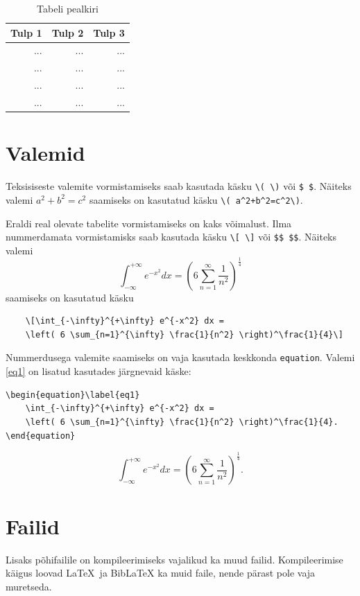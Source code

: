 \documentclass{trkut}%
\begin{document}
\begin{table}[htb]
	\caption{Tabeli pealkiri}%
	\label{tabel1}%
	\begin{tabular}{r|r|r}%
		\hline%
		Tulp 1 & Tulp 2 & Tulp 3 \\%
		\hline
		... & ... & ... \\
		... & ... & ... \\
		... & ... & ... \\
		... & ... & ...
	\end{tabular}
\end{table} 

\section{Valemid}
Teksisiseste valemite vormistamiseks saab kasutada käsku \verb!\( \)! või \verb!$ $!. Näiteks valemi \( a^2+b^2=c^2\) saamiseks on kasutatud käsku \verb!\( a^2+b^2=c^2\)!.

Eraldi real olevate tabelite vormistamiseks on kaks võimalust. Ilma nummerdamata vormistamisks saab kasutada käsku \verb!\[ \]! või \verb!$$ $$!. Näiteks valemi 
\[\int_{-\infty}^{+\infty} e^{-x^2} dx = \left( 6 \sum_{n=1}^{\infty} \frac{1}{n^2} \right)^\frac{1}{4}\]
saamiseks on kasutatud käsku 
\begin{verbatim}
    \[\int_{-\infty}^{+\infty} e^{-x^2} dx =
    \left( 6 \sum_{n=1}^{\infty} \frac{1}{n^2} \right)^\frac{1}{4}\]
\end{verbatim}

Nummerdusega valemite saamiseks on vaja kasutada keskkonda \verb!equation!. Valemi \ref{eq1} on lisatud kasutades järgnevaid käske: 
\begin{verbatim}
\begin{equation}\label{eq1}
    \int_{-\infty}^{+\infty} e^{-x^2} dx =
    \left( 6 \sum_{n=1}^{\infty} \frac{1}{n^2} \right)^\frac{1}{4}.
\end{equation}    
\end{verbatim}

\begin{equation}\label{eq1}
    \int_{-\infty}^{+\infty} e^{-x^2} dx = \left( 6 \sum_{n=1}^{\infty} \frac{1}{n^2} \right)^\frac{1}{4}.
\end{equation} 

\section{Failid}
Lisaks põhifailile on kompileerimiseks vajalikud ka muud failid. Kompileerimise käigus loovad \LaTeX\ ja BibLaTeX ka muid faile, nende pärast pole vaja muretseda.
\end{document}
